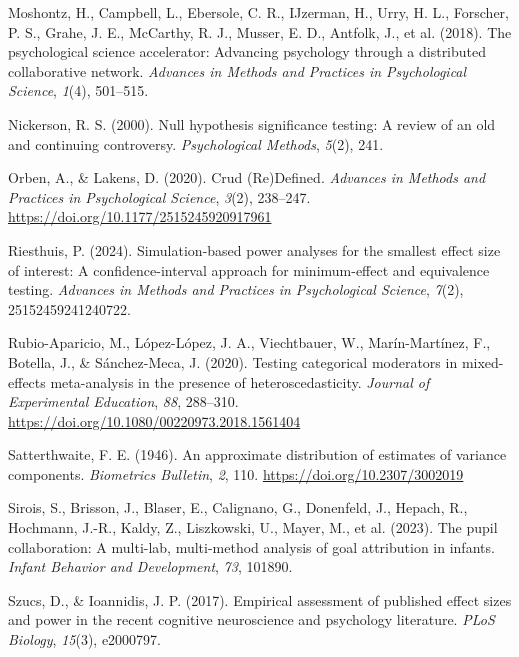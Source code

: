 \documentclass[
  man,floatsintext]{apa7}
\newlength{\cslhangindent}
\newlength{\cslentryspacingunit} %
\newenvironment{CSLReferences}[2] %
 {%
  \setlength{\parindent}{0pt}
  \ifodd #1
  \let\oldpar\par
  \def\par{\hangindent=\cslhangindent\oldpar}
  \fi
  \setlength{\parskip}{#2\cslentryspacingunit}
 }%
 {}
\begin{document}
\begin{CSLReferences}{1}{0}
\leavevmode{}%
Moshontz, H., Campbell, L., Ebersole, C. R., IJzerman, H., Urry, H. L., Forscher, P. S., Grahe, J. E., McCarthy, R. J., Musser, E. D., Antfolk, J., et al. (2018). The psychological science accelerator: Advancing psychology through a distributed collaborative network. \emph{Advances in Methods and Practices in Psychological Science}, \emph{1}(4), 501--515.

\leavevmode{}%
Nickerson, R. S. (2000). Null hypothesis significance testing: A review of an old and continuing controversy. \emph{Psychological Methods}, \emph{5}(2), 241.

\leavevmode{}%
Orben, A., \& Lakens, D. (2020). Crud ({Re}){Defined}. \emph{Advances in Methods and Practices in Psychological Science}, \emph{3}(2), 238--247. \url{https://doi.org/10.1177/2515245920917961}

\leavevmode{}%
Riesthuis, P. (2024). Simulation-based power analyses for the smallest effect size of interest: A confidence-interval approach for minimum-effect and equivalence testing. \emph{Advances in Methods and Practices in Psychological Science}, \emph{7}(2), 25152459241240722.

\leavevmode{}%
Rubio-Aparicio, M., López-López, J. A., Viechtbauer, W., Marín-Martínez, F., Botella, J., \& Sánchez-Meca, J. (2020). Testing categorical moderators in mixed-effects meta-analysis in the presence of heteroscedasticity. \emph{Journal of Experimental Education}, \emph{88}, 288--310. \url{https://doi.org/10.1080/00220973.2018.1561404}

\leavevmode{}%
Satterthwaite, F. E. (1946). An approximate distribution of estimates of variance components. \emph{Biometrics Bulletin}, \emph{2}, 110. \url{https://doi.org/10.2307/3002019}

\leavevmode{}%
Sirois, S., Brisson, J., Blaser, E., Calignano, G., Donenfeld, J., Hepach, R., Hochmann, J.-R., Kaldy, Z., Liszkowski, U., Mayer, M., et al. (2023). The pupil collaboration: A multi-lab, multi-method analysis of goal attribution in infants. \emph{Infant Behavior and Development}, \emph{73}, 101890.

\leavevmode{}%
Szucs, D., \& Ioannidis, J. P. (2017). Empirical assessment of published effect sizes and power in the recent cognitive neuroscience and psychology literature. \emph{PLoS Biology}, \emph{15}(3), e2000797.


\end{CSLReferences}
\end{document}
